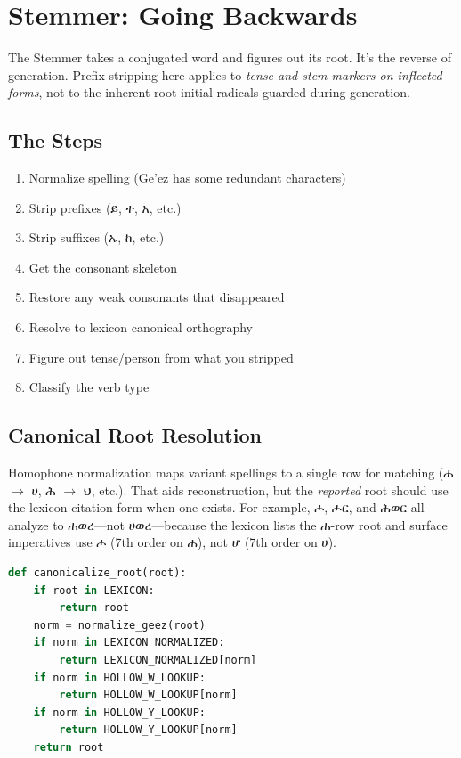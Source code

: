 \documentclass[conference]{IEEEtran}
\newcommand{\geez}[1]{{\ethiopicfont #1}}
\begin{document}
\section{Stemmer: Going Backwards}

The Stemmer takes a conjugated word and figures out its root. It's the reverse of generation. Prefix stripping here applies to \emph{tense and stem markers on inflected forms}, not to the inherent root-initial radicals guarded during generation.

\subsection{The Steps}

\begin{enumerate}
    \item Normalize spelling (Ge'ez has some redundant characters)
    \item Strip prefixes (\geez{ይ}, \geez{ተ}, \geez{አ}, etc.)
    \item Strip suffixes (\geez{ኡ}, \geez{ከ}, etc.)
    \item Get the consonant skeleton
    \item Restore any weak consonants that disappeared
    \item Resolve to lexicon canonical orthography
    \item Figure out tense/person from what you stripped
    \item Classify the verb type
\end{enumerate}

\subsection{Canonical Root Resolution}

Homophone normalization maps variant spellings to a single row for matching (\geez{ሐ} $\rightarrow$ \geez{ሀ}, \geez{ሕ} $\rightarrow$ \geez{ህ}, etc.). That aids reconstruction, but the \emph{reported} root should use the lexicon citation form when one exists. For example, \geez{ሖ}, \geez{ሖር}, and \geez{ሕወር} all analyze to \geez{ሐወረ}---not \geez{ሀወረ}---because the lexicon lists the \geez{ሐ}-row root and surface imperatives use \geez{ሖ} (7th order on \geez{ሐ}), not \geez{ሆ} (7th order on \geez{ሀ}).

\begin{lstlisting}[language=Python]
def canonicalize_root(root):
    if root in LEXICON:
        return root
    norm = normalize_geez(root)
    if norm in LEXICON_NORMALIZED:
        return LEXICON_NORMALIZED[norm]
    if norm in HOLLOW_W_LOOKUP:
        return HOLLOW_W_LOOKUP[norm]
    if norm in HOLLOW_Y_LOOKUP:
        return HOLLOW_Y_LOOKUP[norm]
    return root
\end{lstlisting}
\end{document}
